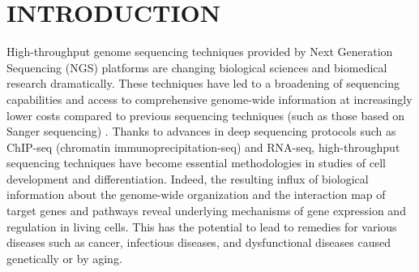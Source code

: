 \documentclass{cpeauth}
\begin{document}
%
%
%
%
%



\section{INTRODUCTION} 




High-throughput genome sequencing techniques provided by Next
Generation Sequencing (NGS) platforms are changing biological sciences
and biomedical research
dramatically\cite{mardis2008-tig,mardis2008-arghg}. These techniques
have led to a broadening of sequencing capabilities and access to
comprehensive genome-wide information at increasingly lower costs
compared to previous sequencing techniques (such as those based on
Sanger sequencing)
\cite{metzker2010,mardis2008-tig,mardis2008-arghg,gilad2009,mortazavi2008,sorek2010}.
Thanks to advances in deep sequencing protocols such as ChIP-seq
(chromatin immunoprecipitation-seq) and RNA-seq, high-throughput
sequencing techniques have become essential methodologies in studies
of cell development and
differentiation\cite{wang2009-natrevgen,pepke2009,gilad2009,mortazavi2008,sorek2010}.
Indeed, the resulting influx of biological information about the
genome-wide organization and the interaction map of target genes and
pathways reveal underlying mechanisms of gene expression and
regulation in living cells. This has the potential to lead to remedies
for various diseases such as cancer, infectious diseases, and
dysfunctional diseases caused genetically or by
aging\cite{amaral2008,encode2007,baek2008,costa2009}.
\end{document}
